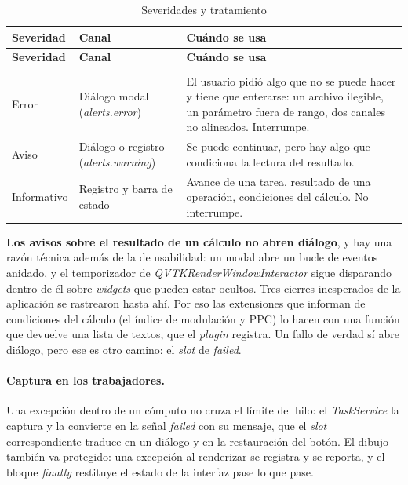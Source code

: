 \documentclass[12pt,letterpaper,oneside]{article}
\DeclareRobustCommand{\_}{\textunderscore\allowbreak}
\begin{document}
\begin{center}
\small
\begin{longtable}{|p{}|p{}|p{}|}
\hline
\textbf{Severidad} & \textbf{Canal} & \textbf{Cuándo se usa} \\
\hline
\endfirsthead
\hline
\textbf{Severidad} & \textbf{Canal} & \textbf{Cuándo se usa} \\
\hline
\endhead
\hline
\endfoot
\hline
\caption{Severidades y tratamiento} \label{tab:sdd_severidades} \\
\endlastfoot

Error & Diálogo modal (\textit{alerts.error}) & El usuario pidió algo que no se puede hacer y tiene que enterarse: un archivo ilegible, un parámetro fuera de rango, dos canales no alineados. Interrumpe. \\
\hline
Aviso & Diálogo o registro (\textit{alerts.warning}) & Se puede continuar, pero hay algo que condiciona la lectura del resultado. \\
\hline
Informativo & Registro y barra de estado & Avance de una tarea, resultado de una operación, condiciones del cálculo. No interrumpe. \\
\hline

\end{longtable}
\end{center}

\textbf{Los avisos sobre el resultado de un cálculo no abren diálogo}, y hay una razón técnica además de la de usabilidad: un modal abre un bucle de eventos anidado, y el temporizador de \textit{QVTKRenderWindowInteractor} sigue disparando dentro de él sobre \textit{widgets} que pueden estar ocultos. Tres cierres inesperados de la aplicación se rastrearon hasta ahí. Por eso las extensiones que informan de condiciones del cálculo (el índice de modulación y PPC) lo hacen con una función que devuelve una lista de textos, que el \textit{plugin} registra. Un fallo de verdad sí abre diálogo, pero ese es otro camino: el \textit{slot} de \textit{failed}.

\paragraph{Captura en los trabajadores.} Una excepción dentro de un cómputo no cruza el límite del hilo: el \textit{TaskService} la captura y la convierte en la señal \textit{failed} con su mensaje, que el \textit{slot} correspondiente traduce en un diálogo y en la restauración del botón. El dibujo también va protegido: una excepción al renderizar se registra y se reporta, y el bloque \textit{finally} restituye el estado de la interfaz pase lo que pase.
\end{document}
